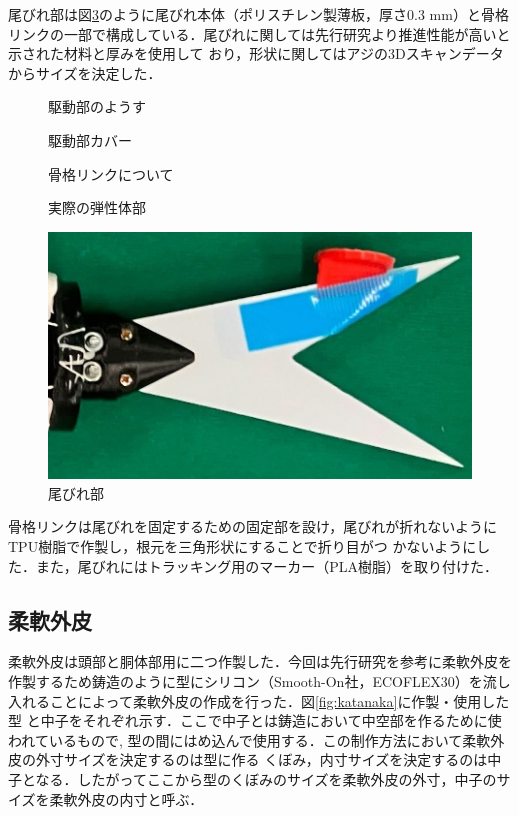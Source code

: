尾びれ部は図\ref{fig:obire}のように尾びれ本体（ポリスチレン製薄板，厚さ0.3 mm）と骨格リンクの一部で構成している．尾びれに関しては先行研究\cite{ni}より推進性能が高いと示された材料と厚みを使用して
おり，形状に関してはアジの3Dスキャンデータからサイズを決定した．
\begin{figure}[hb]
    \centering
    \begin{minipage}[b]{0.32\linewidth}
        \centering
        \caption{駆動部のようす}
        \label{fig:kudou}
    \end{minipage}
    \hspace{0.1\linewidth}
    \begin{minipage}[b]{0.3\linewidth}
        \centering
        \caption{駆動部カバー}
        \label{fig:cover}
    \end{minipage}
\end{figure}
\begin{figure}[hb]
    \centering
    \begin{minipage}[b]{0.30\linewidth}
        \centering
        \caption{骨格リンクについて}
        \label{fig:link2}
    \end{minipage}
    \hspace{0.1\linewidth}
    \begin{minipage}[b]{0.33\linewidth}
        \centering
        \caption{実際の弾性体部}
        \label{fig:real_link}
    \end{minipage}
\end{figure}
\begin{figure}[t]
    \centering
    \includegraphics[width=0.5\linewidth]{chapters/picture/obire.jpg}
    \caption{尾びれ部}
    \label{fig:obire}
\end{figure}
骨格リンクは尾びれを固定するための固定部を設け，尾びれが折れないようにTPU樹脂で作製し，根元を三角形状にすることで折り目がつ
かないようにした．また，尾びれにはトラッキング用のマーカー（PLA樹脂）を取り付けた．

\subsection{柔軟外皮}
柔軟外皮は頭部と胴体部用に二つ作製した．今回は先行研究\cite{kyu}を参考に柔軟外皮を作製するため鋳造のように型にシリコン（Smooth-On社，ECOFLEX30）を流し入れることによって柔軟外皮の作成を行った．図\ref{fig:katanaka}に作製・使用した型
と中子をそれぞれ示す．ここで中子とは鋳造において中空部を作るために使われているもので, 型の間にはめ込んで使用する．この制作方法において柔軟外皮の外寸サイズを決定するのは型に作る
くぼみ，内寸サイズを決定するのは中子となる．したがってここから型のくぼみのサイズを柔軟外皮の外寸，中子のサイズを柔軟外皮の内寸と呼ぶ．

